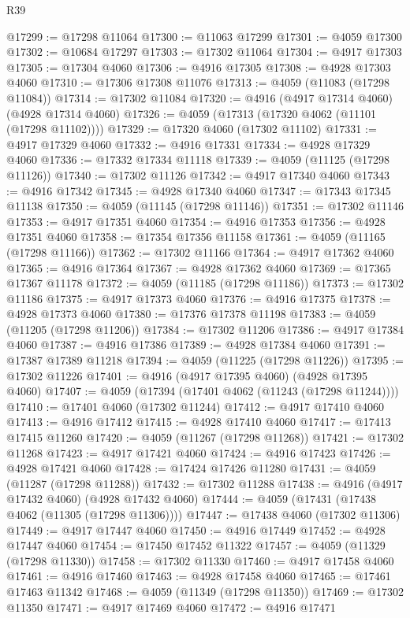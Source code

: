 \begin{lexlean}{R39}
\begin{coremodule}
@17299 := @17298 @11064
@17300 := @11063 @17299
@17301 := @4059 @17300
@17302 := @10684 @17297
@17303 := @17302 @11064
@17304 := @4917 @17303
@17305 := @17304 @4060
@17306 := @4916 @17305
@17308 := @4928 @17303 @4060
@17310 := @17306 @17308 @11076
@17313 := @4059 (@11083 (@17298 @11084))
@17314 := @17302 @11084
@17320 := @4916 (@4917 @17314 @4060) (@4928 @17314 @4060)
@17326 := @4059 (@17313 (@17320 @4062 (@11101 (@17298 @11102))))
@17329 := @17320 @4060 (@17302 @11102)
@17331 := @4917 @17329 @4060
@17332 := @4916 @17331
@17334 := @4928 @17329 @4060
@17336 := @17332 @17334 @11118
@17339 := @4059 (@11125 (@17298 @11126))
@17340 := @17302 @11126
@17342 := @4917 @17340 @4060
@17343 := @4916 @17342
@17345 := @4928 @17340 @4060
@17347 := @17343 @17345 @11138
@17350 := @4059 (@11145 (@17298 @11146))
@17351 := @17302 @11146
@17353 := @4917 @17351 @4060
@17354 := @4916 @17353
@17356 := @4928 @17351 @4060
@17358 := @17354 @17356 @11158
@17361 := @4059 (@11165 (@17298 @11166))
@17362 := @17302 @11166
@17364 := @4917 @17362 @4060
@17365 := @4916 @17364
@17367 := @4928 @17362 @4060
@17369 := @17365 @17367 @11178
@17372 := @4059 (@11185 (@17298 @11186))
@17373 := @17302 @11186
@17375 := @4917 @17373 @4060
@17376 := @4916 @17375
@17378 := @4928 @17373 @4060
@17380 := @17376 @17378 @11198
@17383 := @4059 (@11205 (@17298 @11206))
@17384 := @17302 @11206
@17386 := @4917 @17384 @4060
@17387 := @4916 @17386
@17389 := @4928 @17384 @4060
@17391 := @17387 @17389 @11218
@17394 := @4059 (@11225 (@17298 @11226))
@17395 := @17302 @11226
@17401 := @4916 (@4917 @17395 @4060) (@4928 @17395 @4060)
@17407 := @4059 (@17394 (@17401 @4062 (@11243 (@17298 @11244))))
@17410 := @17401 @4060 (@17302 @11244)
@17412 := @4917 @17410 @4060
@17413 := @4916 @17412
@17415 := @4928 @17410 @4060
@17417 := @17413 @17415 @11260
@17420 := @4059 (@11267 (@17298 @11268))
@17421 := @17302 @11268
@17423 := @4917 @17421 @4060
@17424 := @4916 @17423
@17426 := @4928 @17421 @4060
@17428 := @17424 @17426 @11280
@17431 := @4059 (@11287 (@17298 @11288))
@17432 := @17302 @11288
@17438 := @4916 (@4917 @17432 @4060) (@4928 @17432 @4060)
@17444 := @4059 (@17431 (@17438 @4062 (@11305 (@17298 @11306))))
@17447 := @17438 @4060 (@17302 @11306)
@17449 := @4917 @17447 @4060
@17450 := @4916 @17449
@17452 := @4928 @17447 @4060
@17454 := @17450 @17452 @11322
@17457 := @4059 (@11329 (@17298 @11330))
@17458 := @17302 @11330
@17460 := @4917 @17458 @4060
@17461 := @4916 @17460
@17463 := @4928 @17458 @4060
@17465 := @17461 @17463 @11342
@17468 := @4059 (@11349 (@17298 @11350))
@17469 := @17302 @11350
@17471 := @4917 @17469 @4060
@17472 := @4916 @17471

\end{coremodule}
\end{lexlean}
